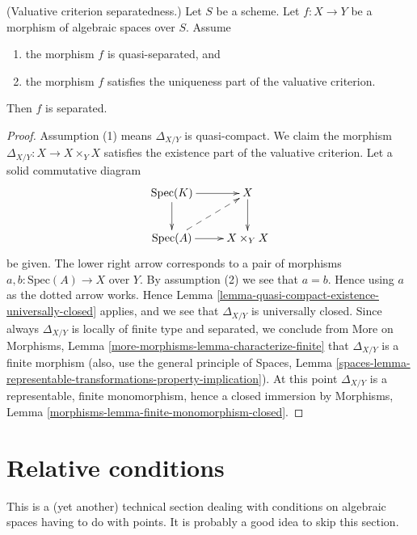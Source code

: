 \begin{lemma}
\label{lemma-valuative-criterion-separatedness}
(Valuative criterion separatedness.)
Let $S$ be a scheme.
Let $f : X \to Y$ be a morphism of algebraic spaces over $S$.
Assume
\begin{enumerate}
\item the morphism $f$ is quasi-separated, and
\item the morphism $f$ satisfies the uniqueness
part of the valuative criterion.
\end{enumerate}
Then $f$ is separated.
\end{lemma}

\begin{proof}
Assumption (1) means $\Delta_{X/Y}$ is quasi-compact.
We claim the morphism
$\Delta_{X/Y} : X \to X \times_Y X$ satisfies the existence
part of the valuative criterion.
Let a solid commutative diagram
$$
\xymatrix{
\text{Spec}(K) \ar[r] \ar[d] & X \ar[d] \\
\text{Spec}(A) \ar[r] \ar@{-->}[ru] & X \times_Y X
}
$$
be given. The lower right arrow corresponds to a
pair of morphisms $a, b : \text{Spec}(A) \to X$ over $Y$.
By assumption (2) we see that $a = b$. Hence using $a$ as the dotted
arrow works. Hence
Lemma \ref{lemma-quasi-compact-existence-universally-closed}
applies, and we see that $\Delta_{X/Y}$ is universally closed.
Since always $\Delta_{X/Y}$ is locally of finite type and
separated, we conclude from
More on Morphisms, Lemma \ref{more-morphisms-lemma-characterize-finite}
that $\Delta_{X/Y}$ is a finite morphism (also, use the
general principle of
Spaces, Lemma
\ref{spaces-lemma-representable-transformations-property-implication}).
At this point $\Delta_{X/Y}$ is a representable, finite monomorphism,
hence a closed immersion by
Morphisms, Lemma \ref{morphisms-lemma-finite-monomorphism-closed}.
\end{proof}








\section{Relative conditions}
\label{section-relative-conditions}

\noindent
This is a (yet another) technical section dealing with conditions on
algebraic spaces having to do with points. It is probably a good idea
to skip this section.

